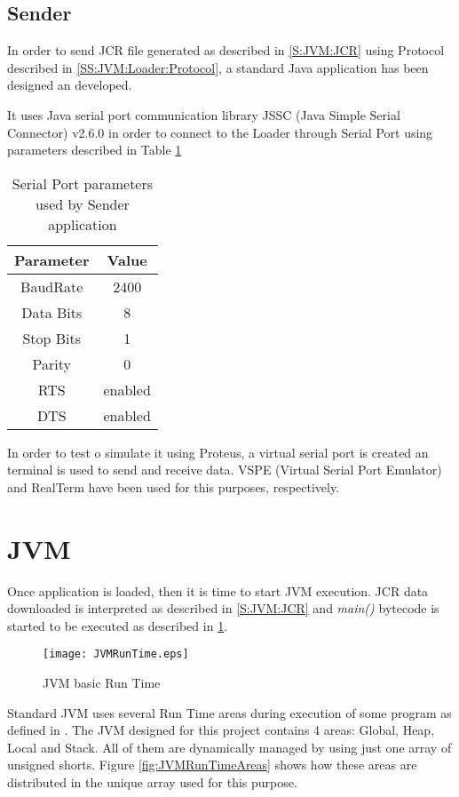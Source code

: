 \subsection{Sender}\label{SS:JVM:Loader:Sender}
In order to send JCR file generated as described in \ref{S:JVM:JCR} using Protocol described in \ref{SS:JVM:Loader:Protocol}, a standard Java application has been designed an developed.

It uses Java serial port communication library JSSC (Java Simple Serial Connector) v2.6.0 in order to connect to the Loader through Serial Port using parameters described in Table \ref{tab:SS:JVM:Loader:Sender:Params}

\begin{table}[!htb]
\centering
\begin{tabular}{|c|c|}
\hline 
Parameter & Value \\ 
\hline 
BaudRate & 2400 \\ 
\hline 
Data Bits & 8 \\ 
\hline 
Stop Bits & 1 \\ 
\hline 
Parity & 0 \\ 
\hline 
RTS & enabled \\ 
\hline 
DTS & enabled \\ 
\hline 
\end{tabular}
\caption{Serial Port parameters used by Sender application}
\label{tab:SS:JVM:Loader:Sender:Params}
\end{table}

In order to test o simulate it using Proteus, a virtual serial port is created an terminal is used to send and receive data. VSPE (Virtual Serial Port Emulator) and RealTerm have been used for this purposes, respectively.

\section{JVM}\label{S:JVM:RunTime}
Once application is loaded, then it is time to start JVM execution. JCR data downloaded is interpreted as described in \ref{S:JVM:JCR} and \textit{main()} bytecode is started to be executed as described in \ref{fig:JVMRunTime}.

\begin{figure}[H]
\centering
\texttt{[image: JVMRunTime.eps]}
\caption{JVM basic Run Time}
\label{fig:JVMRunTime}
\end{figure}

Standard JVM uses several Run Time areas during execution of some program as defined in \cite{Art:JVMSE7}. The JVM designed for this project contains 4 areas: Global, Heap, Local and Stack. All of them are dynamically managed by using just one array of unsigned shorts. Figure \ref{fig:JVMRunTimeAreas} shows how these areas are distributed in the unique array used for this purpose.

